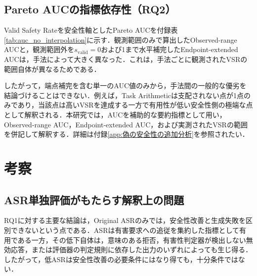 \documentclass{article}
\begin{document}
\subsection{Pareto AUCの指標依存性（RQ2）}
Valid Safety Rateを安全性軸としたPareto AUCを付録表\ref{tab:auc_no_interpolation}に示す．観測範囲のみで算出したObserved-range AUCと，観測範囲外を$s_{\mathrm{valid}}=0$および1まで水平補完したEndpoint-extended AUCは，手法によって大きく異なった．これは，手法ごとに観測されたVSRの範囲自体が異なるためである．

したがって，端点補完を含む単一のAUC値のみから，手法間の一般的な優劣を結論づけることはできない．例えば，Task Arithmeticは支配されない点が1点のみであり，当該点は高いVSRを達成する一方で有用性が低い安全性側の極端な点として解釈される．本研究では，AUCを補助的な要約指標として用い，Observed-range AUC，Endpoint-extended AUC，および実測されたVSRの範囲を併記して解釈する．詳細は付録\ref{app:偽の安全性の追加分析}を参照されたい．




\section{考察}
\subsection{ASR単独評価がもたらす解釈上の問題}
RQ1に対する主要な結論は，Original ASRのみでは，安全性改善と生成失敗を区別できないという点である．ASRは有害要求への追従を集約した指標として有用である一方，その低下自体は，意味のある拒否，有害性判定器が検出しない無効応答，または評価器の判定規則に依存した出力のいずれによっても生じ得る．したがって，低ASRは安全性改善の必要条件にはなり得ても，十分条件ではない．
\end{document}
